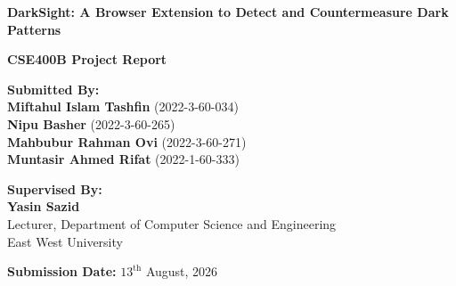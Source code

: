 \documentclass[12pt,a4paper]{article}
\begin{document}
\begin{titlepage}
    \centering
    
    \par
    
    \vspace{1cm}
    
    {\Huge \textbf{DarkSight: A Browser Extension to Detect and Countermeasure Dark Patterns}\par}
    
    \vspace{1cm}
    
    {\LARGE \textbf{CSE400B Project Report}\par}
    
    \vspace{1.5cm}
    
    \textbf{Submitted By:}\\[0.5em]
    \large
    \textbf{Miftahul Islam Tashfin} (2022-3-60-034) \\[0.5em]
    \textbf{Nipu Basher} (2022-3-60-265) \\[0.5em]
    \textbf{Mahbubur Rahman Ovi} (2022-3-60-271) \\[0.5em]
    \textbf{Muntasir Ahmed Rifat} (2022-1-60-333) \par
    
    \vspace{1.5cm}
    
    \textbf{Supervised By:}\\[0.5em]
    \large
    \textbf{Yasin Sazid} \\
    Lecturer, Department of Computer Science and Engineering \\
    East West University\par
    
    \vfill
    
    {\large \textbf{Submission Date:} $13^{\text{th}}$ August, 2026\par}
\end{titlepage}

\newpage
\setcounter{page}{2}
\end{document}
